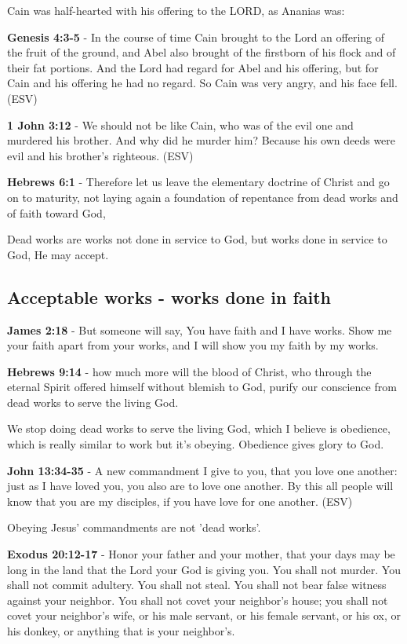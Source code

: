\documentclass[11pt]{article}
\begin{document}
Cain was half-hearted with his offering to the LORD, as Ananias was:

\textbf{Genesis 4:3-5} - In the course of time Cain brought to the Lord an offering of the fruit of the ground, and Abel also brought of the firstborn of his flock and of their fat portions. And the Lord had regard for Abel and his offering, but for Cain and his offering he had no regard. So Cain was very angry, and his face fell. (ESV)

\textbf{1 John 3:12} - We should not be like Cain, who was of the evil one and murdered his brother. And why did he murder him? Because his own deeds were evil and his brother's righteous. (ESV)

\textbf{Hebrews 6:1} - Therefore let us leave the elementary doctrine of Christ and go on to maturity, not laying again a foundation of repentance from dead works and of faith toward God,

Dead works are works not done in service to God, but works done in service to God, He may accept.

\subsection{Acceptable works - works done in faith}
\label{sec:org3f3d163}
\textbf{James 2:18} - But someone will say, You have faith and I have works. Show me your faith apart from your works, and I will show you my faith by my works.

\textbf{Hebrews 9:14} - how much more will the blood of Christ, who through the eternal Spirit offered himself without blemish to God, purify our conscience from dead works to serve the living God.

We stop doing dead works to serve the living God, which I believe is obedience,
which is really similar to work but it's obeying. Obedience gives glory to God.

\textbf{John 13:34-35} - A new commandment I give to you, that you love one another: just as I have loved you, you also are to love one another. By this all people will know that you are my disciples, if you have love for one another. (ESV)

Obeying Jesus' commandments are not 'dead works'.

\textbf{Exodus 20:12-17} - Honor your father and your mother, that your days may be long in the land that the Lord your God is giving you. You shall not murder. You shall not commit adultery. You shall not steal. You shall not bear false witness against your neighbor. You shall not covet your neighbor's house; you shall not covet your neighbor's wife, or his male servant, or his female servant, or his ox, or his donkey, or anything that is your neighbor's.
\end{document}
